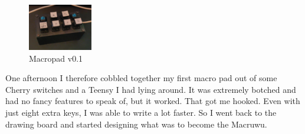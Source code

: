 \documentclass[english, 12pt]{scrartcl}
\begin{document}
	\begin{figure}
		\vspace{-0.8cm}
		\centering
		\includegraphics[width=0.25\textwidth]{Macropad 0-1}
		\caption{Macropad v0.1}
	\end{figure}
	\noindent One afternoon I therefore cobbled together my first macro pad out of some Cherry switches and a Teensy I had lying around. It was extremely botched and had no fancy features to speak of, but it worked. That got me hooked. Even with just eight extra keys, I was able to write a lot faster. So I went back to the drawing board and started designing what was to become the Macruwu.
\end{document}
